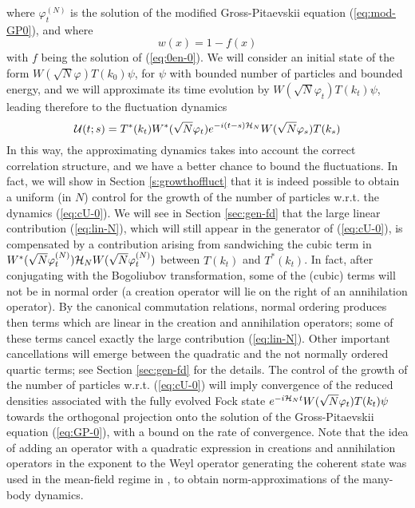 \documentclass[11pt,a4paper]{article}
\newcommand{\cU}{{\cal U}}
\newcommand{\cH}{{\cal H}}
\begin{document}
where $\varphi^{(N)}_t$ is the solution of the modified Gross-Pitaevskii equation (\ref{eq:mod-GP0}), and where
\[ w (x) = 1 - f(x) \]
with $f$ being the solution of (\ref{eq:0en-0}). We will consider an initial state of the form $W(\sqrt{N} \varphi) T(k_0) \psi$, for $\psi$ with bounded number of particles and bounded energy, and we will approximate its time evolution by $W(\sqrt{N} \varphi_t) T(k_t) \psi$, leading therefore to the fluctuation dynamics 
\begin{equation}\label{eq:cU-0} \cU (t;s) = T^* (k_t) W^* (\sqrt{N} \varphi_t) e^{-i(t-s) \cH_N} W(\sqrt{N} \varphi_s) T(k_s) \end{equation}
In this way, the approximating dynamics takes into account the correct correlation structure, and we have a better chance to bound the fluctuations. In fact, we will show in Section \ref{s:growthoffluct} that it is indeed possible to obtain a uniform (in $N$) control for the growth of the number of particles w.r.t. the dynamics (\ref{eq:cU-0}). We will see in Section \ref{sec:gen-fd} that the large linear contribution (\ref{eq:lin-N}), which will still appear in the generator of (\ref{eq:cU-0}), is compensated by a contribution arising from sandwiching the cubic term in $W^* (\sqrt{N} \varphi_t^{(N)}) \cH_N W(\sqrt{N} \varphi_t^{(N)})$ between $T(k_t)$ and $T^* (k_t)$. In fact, after conjugating with the Bogoliubov transformation, some of the (cubic) terms will not be in normal order (a creation operator will lie on the right of an annihilation operator). By the canonical commutation relations, normal ordering produces then terms which are linear in the creation and annihilation operators; some of these terms cancel exactly the large contribution (\ref{eq:lin-N}). Other important cancellations will emerge between the quadratic and the not normally ordered quartic terms; see Section \ref{sec:gen-fd} for the details. The control of the growth of the number of particles w.r.t. (\ref{eq:cU-0}) will imply convergence of the reduced densities associated with the fully evolved Fock state $e^{-i \cH_N t} W(\sqrt{N} \varphi_t) T(k_t) \psi$ towards the orthogonal projection onto the solution of the Gross-Pitaevskii equation (\ref{eq:GP-0}), with a bound on the rate of convergence. Note that the idea of adding an operator with a quadratic expression in creations and annihilation operators in the exponent to the Weyl operator generating the coherent state was used in the mean-field regime in \cite{GMM2010}, to obtain norm-approximations of the many-body dynamics. 
\end{document}
